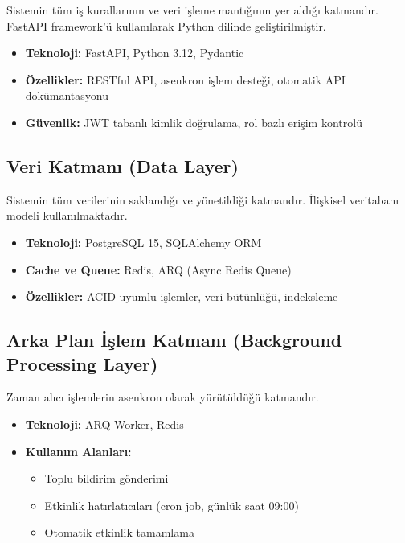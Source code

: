 \documentclass[a4paper,12pt]{report}
\begin{document}
Sistemin tüm iş kurallarının ve veri işleme mantığının yer aldığı katmandır. FastAPI framework'ü kullanılarak Python dilinde geliştirilmiştir.

\begin{itemize}
    \item \textbf{Teknoloji:} FastAPI, Python 3.12, Pydantic
    \item \textbf{Özellikler:} RESTful API, asenkron işlem desteği, otomatik API dokümantasyonu
    \item \textbf{Güvenlik:} JWT tabanlı kimlik doğrulama, rol bazlı erişim kontrolü
\end{itemize}

\subsection{Veri Katmanı (Data Layer)}

Sistemin tüm verilerinin saklandığı ve yönetildiği katmandır. İlişkisel veritabanı modeli kullanılmaktadır.

\begin{itemize}
    \item \textbf{Teknoloji:} PostgreSQL 15, SQLAlchemy ORM
    \item \textbf{Cache ve Queue:} Redis, ARQ (Async Redis Queue)
    \item \textbf{Özellikler:} ACID uyumlu işlemler, veri bütünlüğü, indeksleme
\end{itemize}

\subsection{Arka Plan İşlem Katmanı (Background Processing Layer)}

Zaman alıcı işlemlerin asenkron olarak yürütüldüğü katmandır.

\begin{itemize}
    \item \textbf{Teknoloji:} ARQ Worker, Redis
    \item \textbf{Kullanım Alanları:}
    \begin{itemize}
        \item Toplu bildirim gönderimi
        \item Etkinlik hatırlatıcıları (cron job, günlük saat 09:00)
        \item Otomatik etkinlik tamamlama
    \end{itemize}
\end{itemize}
\end{document}
